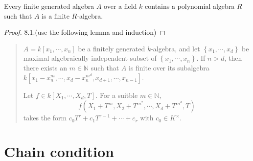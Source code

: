 \begin{theorem}
  Every finite generated algebra \( A \) over a field \( k \) contains a polynomial algebra \( R \) such that \( A \) is a finite \( R \)-algebra.
\end{theorem}
\begin{proof}
  \cite{milneCA} 8.1.(use the following lemma and induction)
\end{proof}
\begin{quote}
  \begin{lemma}
    \( A = k[x_1, \cdots, x_n] \) be a finitely generated \( k \)-algebra, and let \( \left\lbrace x_1, \cdots, x_d \right\rbrace \) be maximal algebraically independent subset of \( \left\lbrace x_1, \cdots, x_n \right\rbrace \).
    If \( n > d \), then there exists an \( m \in \mathbb{N} \) such that \( A \) is finite over its subalgebra \( k[x_1 - x_n^m, \cdots, x_d - x^{m^d}_n, x_{d + 1}, \cdots, x_{n - 1}] \).
  \end{lemma}
  \begin{lemma}
    Let \( f \in k[X_1, \cdots, X_d, T] \).
    For a suitble \( m \in \mathbb{N} \),
    \[
      f(X_1 + T^m, X_2 + T^{m^2}, \cdots, X_d + T^{m^d}, T)
    \]
    takes the form \( c_0 T^r + c_1 T^{r - 1} + \cdots + c_r \) with \( c_0 \in K^\times \).
  \end{lemma}
\end{quote}

\section{Chain condition}
